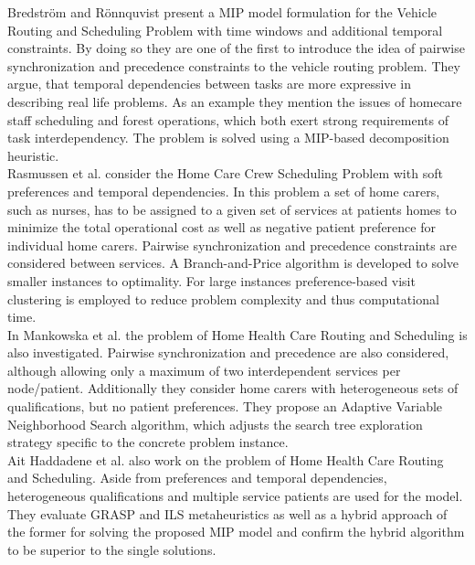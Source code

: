 %
%
Bredström and Rönnquvist \cite{bredstromCombinedVehicleRouting2008a} present a MIP model formulation for the Vehicle Routing and Scheduling Problem with time windows and additional temporal constraints. By doing so they are one of the first to introduce the idea of pairwise synchronization and precedence constraints to the vehicle routing problem. They argue, that temporal dependencies between tasks are more expressive in describing real life problems. As an example they mention the issues of homecare staff scheduling and forest operations, which both exert strong requirements of task interdependency. The problem is solved using a MIP-based decomposition heuristic.\\
%
Rasmussen et al. \cite{rasmussenHomeCareCrew2012} consider the Home Care Crew Scheduling Problem with soft preferences and temporal dependencies. In this problem a set of home carers, such as nurses, has to be assigned to a given set of services at patients homes to minimize the total operational cost as well as negative patient preference for individual home carers. Pairwise synchronization and precedence constraints are considered between services. A Branch-and-Price algorithm is developed to solve smaller instances to optimality. For large instances preference-based visit clustering is employed to reduce problem complexity and thus computational time.\\
%
In Mankowska et al. \cite{mankowskaHomeHealthCare2014} the problem of Home Health Care Routing and Scheduling is also investigated. Pairwise synchronization and precedence are also considered, although allowing only a maximum of two interdependent services per node/patient. Additionally they consider home carers with heterogeneous sets of qualifications, but no patient preferences. They propose an Adaptive Variable Neighborhood Search algorithm, which adjusts the search tree exploration strategy specific to the concrete problem instance.\\
%
Ait Haddadene et al. \cite{aithaddadeneGRASPILSVehicle2016} also work on the problem of Home Health Care Routing and Scheduling. Aside from preferences and temporal dependencies, heterogeneous qualifications and multiple service patients are used for the model. They evaluate GRASP and ILS metaheuristics as well as a hybrid approach of the former for solving the proposed MIP model and confirm the hybrid algorithm to be superior to the single solutions.\\
